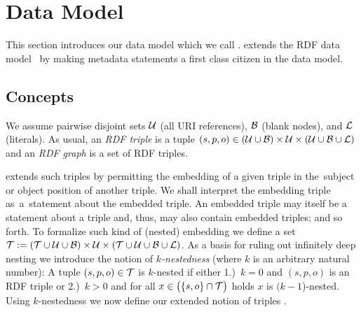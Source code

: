 \section{Data Model} \label{Section:DataModel}

This section introduces our data model which we call \emph{\RDFplus}. {\RDFplus} extends the RDF data model~\cite{Klyne04:RDFconcepts} by making metadata statements a first class citizen in the data model.



\subsection{Concepts}

We assume
pairwise disjoint sets $\mathcal{U}$ (all URI references), $\mathcal{B}$ (blank nodes), and $\mathcal{L}$ (literals).
	As usual, an \emph{RDF triple} is a tuple $(s,p,o) \in (\mathcal{U} \cup \mathcal{B}) \times \mathcal{U} \times (\mathcal{U} \cup \mathcal{B} \cup \mathcal{L})$ and an \emph{RDF graph} is a set of RDF triples.

{\RDFplus} extends such triples by permitting the embedding of a given triple in
	the~subject %
or object position of another triple. We shall interpret the embedding triple
	as~a~statement %
about the embedded triple. An embedded triple may itself be a statement about a triple and, thus, may also contain embedded triples; and so forth.
%
	To formalize
such kind of (nested) embedding we
	define
a set $\mathcal{T} := (\mathcal{T} \cup \mathcal{U} \cup \mathcal{B}) \times \mathcal{U} \times (\mathcal{T} \cup \mathcal{U} \cup \mathcal{B} \cup \mathcal{L})$.
%
	As a basis for ruling
out infinitely deep nesting we introduce the notion of \emph{$k$-nestedness} (where $k$
	is an arbitrary
natural number): A tuple $(s,p,o) \in \mathcal{T}$ is $k$-nested if either 1.)~$k=0$ and
	$(s,p,o)$ is an RDF triple
or 2.)~$k>0$ and for all $x \in \bigl( \lbrace s,o \rbrace \cap \mathcal{T} \bigr)$ holds $x$ is $(k\!-\!1$)-nested. Using $k$-nestedness we now define our extended notion of triples%
	.

